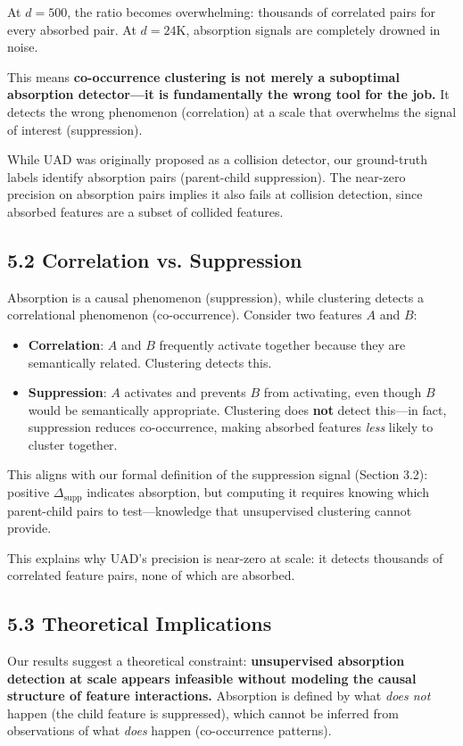 \documentclass{article}
\begin{document}
At $d = 500$, the ratio becomes overwhelming: thousands of correlated pairs for every absorbed pair. At $d = 24$K, absorption signals are completely drowned in noise.

This means \textbf{co-occurrence clustering is not merely a suboptimal absorption detector---it is fundamentally the wrong tool for the job.} It detects the wrong phenomenon (correlation) at a scale that overwhelms the signal of interest (suppression).

While UAD was originally proposed as a collision detector, our ground-truth labels identify absorption pairs (parent-child suppression). The near-zero precision on absorption pairs implies it also fails at collision detection, since absorbed features are a subset of collided features.

\subsection{5.2 Correlation vs. Suppression}

Absorption is a causal phenomenon (suppression), while clustering detects a correlational phenomenon (co-occurrence). Consider two features $A$ and $B$:
\begin{itemize}
  \item \textbf{Correlation}: $A$ and $B$ frequently activate together because they are semantically related. Clustering detects this.
  \item \textbf{Suppression}: $A$ activates and prevents $B$ from activating, even though $B$ would be semantically appropriate. Clustering does \textbf{not} detect this---in fact, suppression reduces co-occurrence, making absorbed features \textit{less} likely to cluster together.
\end{itemize}

This aligns with our formal definition of the suppression signal (Section 3.2): positive $\Delta_{\text{supp}}$ indicates absorption, but computing it requires knowing which parent-child pairs to test---knowledge that unsupervised clustering cannot provide.

This explains why UAD's precision is near-zero at scale: it detects thousands of correlated feature pairs, none of which are absorbed.

\subsection{5.3 Theoretical Implications}

Our results suggest a theoretical constraint: \textbf{unsupervised absorption detection at scale appears infeasible without modeling the causal structure of feature interactions.} Absorption is defined by what \textit{does not} happen (the child feature is suppressed), which cannot be inferred from observations of what \textit{does} happen (co-occurrence patterns).
\end{document}
